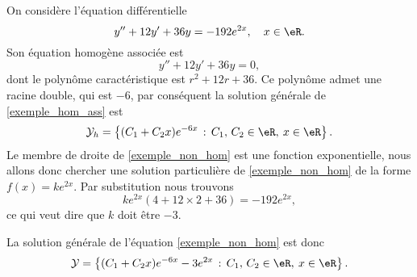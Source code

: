 \begin{example}
	On considère l'équation différentielle
	\begin{equation}\label{exemple_non_hom}
		y'' + 12y' + 36 y = -192 e^{2x}, \quad x\in\eR.
	\end{equation}
	Son équation homogène associée est
	\begin{equation}\label{exemple_hom_ass}
		y'' + 12y' + 36 y = 0,
	\end{equation}
	dont le polynôme caractéristique est \( r^2 + 12 r + 36\). Ce polynôme admet une racine double, qui est \( -6\), par conséquent la solution générale de \eqref{exemple_hom_ass} est
	\begin{equation*}
		\mathcal{Y}_h  = \left\{(C_1  +C_2x) e^{-6 x} \,:\, C_1,\, C_2 \in \eR, \: x\in \eR\right\}.
	\end{equation*}
	Le membre de droite de \eqref{exemple_non_hom} est une fonction exponentielle, nous allons donc chercher une solution particulière de \eqref{exemple_non_hom} de la forme \( f(x) = ke^{2x}\). Par substitution nous trouvons
	\[
		ke^{2x}(4 + 12 \times 2 +36) = -192 e^{2x},
	\]
	ce qui veut dire que \( k\) doit \^etre \( -3\).

	La solution générale de l'équation \eqref{exemple_non_hom} est donc
	\begin{equation*}
		\mathcal{Y}  = \left\{(C_1  +C_2x) e^{-6 x} -3e^{2x} \,:\, C_1,\, C_2 \in \eR, \: x\in \eR\right\}.
	\end{equation*}
\end{example}

